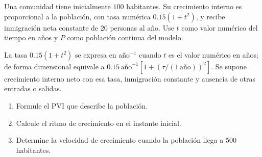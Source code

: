 Una comunidad tiene inicialmente $100$ habitantes. Su crecimiento interno es proporcional a la población, con tasa numérica $0.15(1+t^2)$, y recibe inmigración neta constante de $20$ personas al año. Use $t$ como valor numérico del tiempo en años y $P$ como población continua del modelo.

La tasa $0.15(1+t^2)$ se expresa en año$^{-1}$ cuando $t$ es el valor numérico en años; de forma dimensional equivale a $0.15\,\mathrm{año}^{-1}[1+(\tau/(1\,\mathrm{año}))^2]$. Se supone crecimiento interno neto con esa tasa, inmigración constante y ausencia de otras entradas o salidas.

\begin{enumerate}[label=(\alph*),ref=\alph*,leftmargin=*]
\item Formule el PVI que describe la población.
\item Calcule el ritmo de crecimiento en el instante inicial.
\item Determine la velocidad de crecimiento cuando la población llega a $500$ habitantes.
\end{enumerate}
